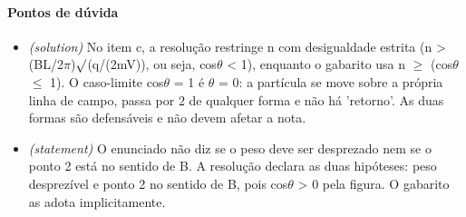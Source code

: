 \documentclass{article}%
\begin{document}
\paragraph{Pontos de dúvida}%
\begin{itemize}%
\item%
\textit{(solution)} No item c, a resolução restringe n com desigualdade estrita (n > (BL/2$\pi$)$\surd$(q/(2mV)), ou seja, cos$\theta$ < 1), enquanto o gabarito usa n $\geq$ (cos$\theta$ $\leq$ 1). O caso{-}limite cos$\theta$ = 1 é $\theta$ = 0: a partícula se move sobre a própria linha de campo, passa por 2 de qualquer forma e não há 'retorno'. As duas formas são defensáveis e não devem afetar a nota.%
\item%
\textit{(statement)} O enunciado não diz se o peso deve ser desprezado nem se o ponto 2 está no sentido de B. A resolução declara as duas hipóteses: peso desprezível e ponto 2 no sentido de B, pois cos$\theta$ > 0 pela figura. O gabarito as adota implicitamente.%
\end{itemize}%
\end{document}
